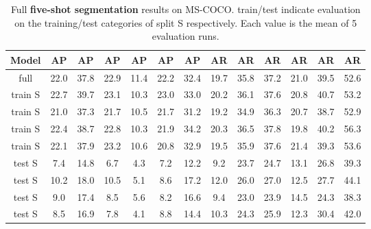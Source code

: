 \documentclass{article}
\newcommand{\coco}{MS-COCO\xspace}
\begin{document}
\begin{table}[h]
\begin{center}
\begin{small}
\begin{tabular}{c|ccc|ccc|ccc|ccc}
Model & AP & AP & AP & AP & AP & AP & AR & AR & AR & AR & AR & AR\\
\hline
full & 22.0 & 37.8 & 22.9 & 11.4 & 22.2 & 32.4 & 19.7 & 35.8 & 37.2 & 21.0 & 39.5 & 52.6
 \\
\hline
train S & 22.7 & 39.7 & 23.1 & 10.3 & 23.0 & 33.0 & 20.2 & 36.1 & 37.6 & 20.8 & 40.7 & 53.2 \\
train S & 21.0 & 37.3 & 21.7 & 10.5 & 21.7 & 31.2 & 19.2 & 34.9 & 36.3 & 20.7 & 38.7 & 52.9 \\
train S & 22.4 & 38.7 & 22.8 & 10.3 & 21.9 & 34.2 & 20.3 & 36.5 & 37.8 & 19.8 & 40.2 & 56.3 \\
train S & 22.1 & 37.9 & 23.2 & 10.6 & 20.8 & 32.9 & 19.5 & 35.9 & 37.6 & 21.4 & 39.3 & 53.6
 \\
\hline
test S & 7.4 & 14.8 & 6.7 & 4.3 & 7.2 & 12.2 & 9.2 & 23.7 & 24.7 & 13.1 & 26.8 & 39.3 \\
test S & 10.2 & 18.0 & 10.5 & 5.1 & 8.6 & 17.2 & 12.0 & 26.0 & 27.0 & 12.5 & 27.7 & 44.1 \\
test S & 9.0 & 17.4 & 8.5 & 5.6 & 8.2 & 16.6 & 9.4 & 23.0 & 23.9 & 14.5 & 24.3 & 38.3 \\
test S & 8.5 & 16.9 & 7.8 & 4.1 & 8.8 & 14.4 & 10.3 & 24.3 & 25.9 & 12.3 & 30.4 & 42.0
\end{tabular}
\end{small}
\end{center}
\caption{Full \textbf{five-shot segmentation} results on \coco. train/test indicate evaluation on the training/test categories of split S respectively. Each value is the mean of 5 evaluation runs.}
\vspace{-12pt}
\label{table:extended_five-shot_segmentation_results}
\end{table}
\end{document}
